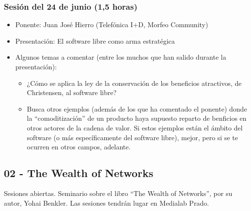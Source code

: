 \documentclass[a4paper,12pt]{article}
\begin{document}


\subsubsection{Sesión del 24 de junio (1,5 horas)}

\begin{itemize}
\item Ponente: Juan José Hierro (Telefónica I+D, Morfeo Community)
\item Presentación: El software libre como arma estratégica
\item Algunos temas a comentar (entre los muchos que han salido durante la presentación): 
  \begin{itemize}
  \item ¿Cómo se aplica la ley de la conservación de los beneficios atractivos, de Christensen, al software libre?
  \item Busca otros ejemplos (además de los que ha comentado el ponente) donde la ``comoditización'' de un producto haya supuesto reparto de benficios en otros actores de la cadena de valor. Si estos ejemplos están el ámbito del software (o más específicamente del software libre), mejor, pero si se te ocurren en otros campos, adelante.
  \end{itemize}
\end{itemize}

\subsection{02 - The Wealth of Networks}

Sesiones abiertas. Seminario sobre el libro ``The Wealth of Networks'', por su autor, Yohai Benkler. Las sesiones tendrán lugar en Medialab Prado.
\end{document}
